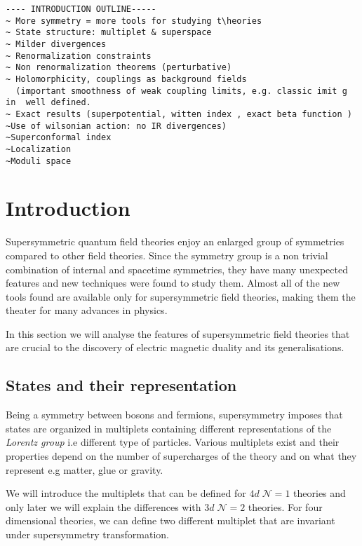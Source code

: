 \begin{lstlisting}
---- INTRODUCTION OUTLINE-----
~ More symmetry = more tools for studying t\heories
~ State structure: multiplet & superspace
~ Milder divergences 
~ Renormalization constraints
~ Non renormalization theorems (perturbative)
~ Holomorphicity, couplings as background fields 
  (important smoothness of weak coupling limits, e.g. classic imit g in  well defined.
~ Exact results (superpotential, witten index , exact beta function )
~Use of wilsonian action: no IR divergences)
~Superconformal index
~Localization
~Moduli space
\end{lstlisting}

\section{Introduction}
Supersymmetric quantum field theories enjoy an enlarged group of  symmetries compared to other field theories. 
Since the symmetry group is a non trivial combination of internal and spacetime symmetries, they have many unexpected features and new techniques were found to study them.
Almost all of the new tools found are available only for supersymmetric field theories, making them the theater for many advances in physics. 

In this section we will analyse the features of supersymmetric field theories that are crucial to the discovery of electric magnetic duality and its generalisations.

\subsection{States and their representation}

Being a symmetry between bosons and fermions, supersymmetry imposes that states are organized in multiplets containing different representations of the \emph{Lorentz group} i.e different type of  particles.
Various multiplets exist and their properties depend on the number of supercharges of the theory and on what they represent e.g matter, glue or gravity. 

We will introduce the multiplets that can be defined for $4d \; \mathcal{N} = 1$ theories and only later we will explain the differences with $3d \; \mathcal{N} = 2$ theories.
For four dimensional theories, we can define two different multiplet that are invariant under supersymmetry transformation.

